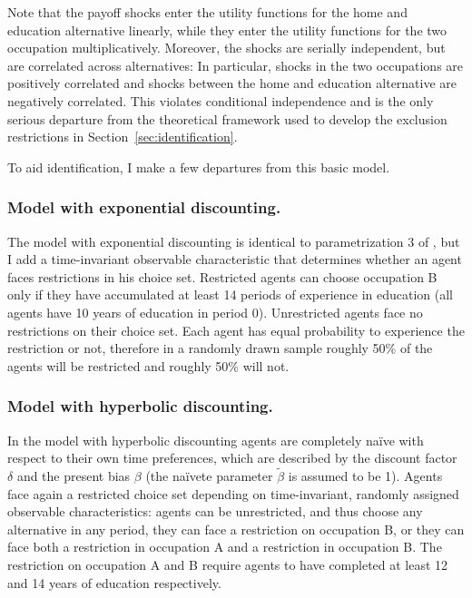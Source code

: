 Note that the payoff shocks enter the utility functions for the home and education alternative linearly, while they enter the utility functions for the two occupation multiplicatively. Moreover, the shocks are serially independent, but are correlated across alternatives: In particular, shocks in the two occupations are positively correlated and shocks between the home and education alternative are negatively correlated. This violates conditional independence and is the only serious departure from the theoretical framework used to develop the exclusion restrictions in Section~\ref{sec:identification}.

To aid identification, I make a few departures from this basic model. 

\subsubsection{Model with exponential discounting.} The model with exponential discounting is identical to parametrization 3 of \textcite{KeaneWolpin1994}, but I add a time-invariant observable characteristic that determines whether an agent faces restrictions in his choice set. Restricted agents can choose occupation B only if they have accumulated at least 14 periods of experience in education (all agents have 10 years of education in period 0). Unrestricted agents face no restrictions on their choice set. Each agent has equal probability to experience the restriction or not, therefore in a randomly drawn sample roughly 50\% of the agents will be restricted and roughly 50\% will not. 

\subsubsection{Model with hyperbolic discounting.} In the model with hyperbolic discounting agents are completely naïve with respect to their own time preferences, which are described by the discount factor $\delta$ and the present bias $\beta$ (the naïvete parameter $\tilde{\beta}$ is assumed to be 1). Agents face again a restricted choice set depending on time-invariant, randomly assigned observable characteristics: agents can be unrestricted, and thus choose any alternative in any period, they can face a restriction on occupation B, or they can face both a restriction in occupation A and a restriction in occupation B. The restriction on occupation A and B require agents to have completed at least 12 and 14 years of education respectively. 

